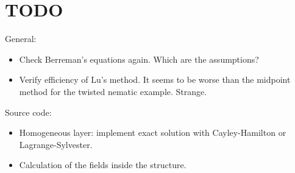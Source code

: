 \section{TODO}

General:
\begin{itemize}
\item Check Berreman's equations again. Which are the assumptions?
\item Verify efficiency of Lu's method. It seems to be worse than the midpoint method for the twisted nematic example. Strange.
\end{itemize}
%
Source code:
\begin{itemize}
\item Homogeneous layer: implement exact solution with Cayley-Hamilton or Lagrange-Sylvester.
\item Calculation of the fields inside the structure.
\end{itemize}



